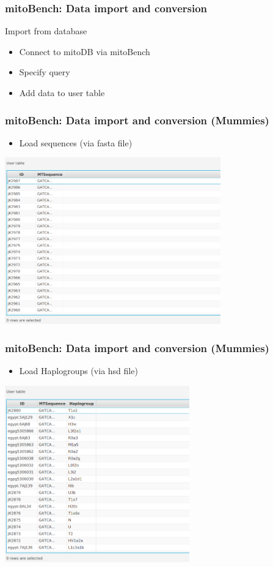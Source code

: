 \documentclass{beamer} %
\begin{document}
\begin{frame}
\frametitle{mitoBench: Data import and conversion}
Import from database
\begin{itemize}
	\item Connect to mitoDB via mitoBench \pause
	\item Specify query \pause
    \item Add data to user table
\end{itemize}
\end{frame}

\begin{frame}
	\frametitle{mitoBench: Data import and conversion (Mummies)}
	\begin{itemize}
		\item Load sequences (via fasta file)
	\end{itemize}
	\begin{center}
		\includegraphics[width=0.7\textwidth]{imagesBench/load_Fasta.png}
	\end{center}
\end{frame}


\begin{frame}
	\frametitle{mitoBench: Data import and conversion (Mummies)}
	\begin{itemize}
		\item Load Haplogroups (via hsd file)
	\end{itemize}
	\begin{center}
		\includegraphics[width=0.6\textwidth]{imagesBench/load_HG.png}
	\end{center}
\end{frame}
\end{document}
